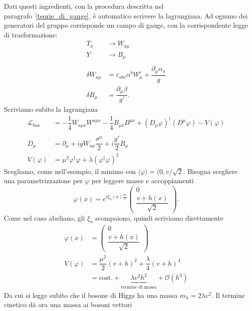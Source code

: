 \documentclass[italian,a4paper]{article}
\theoremstyle{definition}
\newcommand{\lagrbos}{\ensuremath{\mathscr{L}_{\text{bos}}}}
\newcommand{\dimu}{\ensuremath{\partial_{\mu}}}
\newcommand{\Dimu}{\ensuremath{D_{\mu}}}
\begin{document}
Dati questi ingredienti, con la procedura descritta nel
paragrafo~\ref{teorie_di_gauge}, \`e automatico scrivere la lagrangiana. Ad
ognuno dei generatori del gruppo corrisponde un campo di gauge, con la
corrispondente legge di trasformazione:
\begin{align*}
    T_a &\rightarrow W_{a\mu}\\
    Y &\rightarrow B_\mu\\
    \\
    \delta W_{a\mu} &= \varepsilon_{abc}\alpha^b W^c_\mu +
    \dfrac{\dimu \alpha_a}{g}\\
    \delta B_\mu &= \dfrac{\dimu \beta}{g'}.
\end{align*}
Scriviamo subito la lagrangiana
\begin{align*}
    \lagrbos &= -\dfrac{1}{4}W_{a\mu\nu}W^{a\mu\nu} -
    \dfrac{1}{4}B_{\mu\nu}B^{\mu\nu} +
    (D_\mu \varphi)^\dagger (D^\mu \varphi) - V(\varphi)\\
    \\
    \Dimu &= \dimu + i g W_{a\mu}\dfrac{\sigma^a}{2} + i
    \dfrac{g'}{2}B_\mu\\
    V(\varphi) &= \mu^2 \varphi^\dagger \varphi + \lambda (\varphi^\dagger
    \varphi)^2
\end{align*}
Scegliamo, come nell'esempio, il minimo con $\langle \varphi \rangle = (0,
v/\sqrt{2}$.
Bisogna scegliere una parametrizzazione per $\varphi$ per leggere masse e
accoppiamenti
\begin{equation*}
    \varphi(x) = e^{i\xi_a(x)\frac{\sigma^a}{v}}
    \begin{pmatrix}
        0\\
        \dfrac{v + h(x)}{\sqrt{2}}
    \end{pmatrix}.
\end{equation*}
Come nel caso abeliano, gli $\xi_a$ scompaiono, quindi scriviamo
direttamente
\begin{align*}
    \varphi(x) &= 
    \begin{pmatrix}
        0 \\
        \dfrac{v + h(x)}{\sqrt{2}}
    \end{pmatrix}\\
    V(\varphi) &= \dfrac{\mu^2}{2}(v + h)^2 + \dfrac{\lambda}{4}(v + h)^4\\
    &= \text{cost.} + \underbrace{\lambda v^2 h^2}_{\text{termine di massa}} + \mathcal{O}(h^3)
\end{align*}
Da cui si legge subito che il bosone di Higgs ha una massa $m_h = 2\lambda
v^2$. Il termine cinetico d\`a ora una massa ai bosoni vettori
\end{document}
